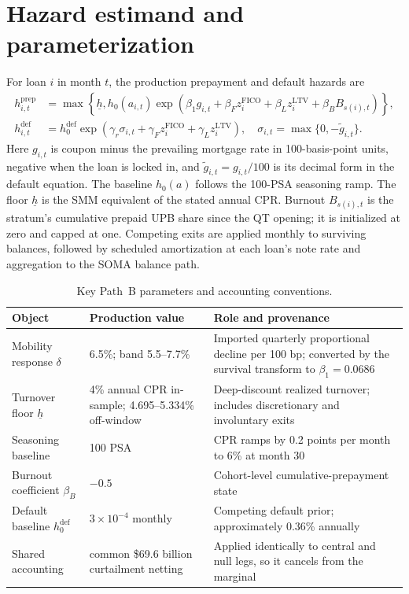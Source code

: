 \documentclass[12pt]{article}
\begin{document}
\section{Hazard estimand and parameterization}\label{app:params}

For loan $i$ in month $t$, the production prepayment and default hazards are
\begin{align}
h^{\mathrm{prep}}_{i,t}
 &= \max\!\left\{\underline h,
 h_0(a_{i,t})\exp\!\left(\beta_1 g_{i,t}+\beta_Fz_i^{\mathrm{FICO}}
 +\beta_Lz_i^{\mathrm{LTV}}+\beta_BB_{s(i),t}\right)\right\},
 \label{eq:appendix-prep}\\
h^{\mathrm{def}}_{i,t}
 &=h^{\mathrm{def}}_0\exp\!\left(\gamma_r\sigma_{i,t}
 +\gamma_Fz_i^{\mathrm{FICO}}+\gamma_Lz_i^{\mathrm{LTV}}\right),
 \quad \sigma_{i,t}=\max\{0,-\widetilde g_{i,t}\}.
 \label{eq:appendix-default}
\end{align}
Here $g_{i,t}$ is coupon minus the prevailing mortgage rate in 100-basis-point
units, negative when the loan is locked in, and $\widetilde g_{i,t}=g_{i,t}/100$
is its decimal form in the default equation. The baseline $h_0(a)$ follows the
100-PSA seasoning ramp. The floor $\underline h$ is the SMM equivalent of the
stated annual CPR. Burnout $B_{s(i),t}$ is the stratum's cumulative prepaid UPB
share since the QT opening; it is initialized at zero and capped at one.
Competing exits are applied monthly to surviving balances, followed by scheduled
amortization at each loan's note rate and aggregation to the SOMA balance path.

\begin{table}[tbp]
\centering
\small
\caption{Key Path~B parameters and accounting conventions.}
\label{tab:pathb-parameters-compact}
\begin{tabular}{@{}p{3.5cm}p{3.0cm}p{7.0cm}@{}}
\toprule
Object & Production value & Role and provenance \\
\midrule
Mobility response $\delta$ & 6.5\%; band 5.5--7.7\% & Imported quarterly proportional decline per 100 bp; converted by the survival transform to $\beta_1=0.0686$ \\
Turnover floor $\underline h$ & 4\% annual CPR in-sample; 4.695--5.334\% off-window & Deep-discount realized turnover; includes discretionary and involuntary exits \\
Seasoning baseline & 100 PSA & CPR ramps by 0.2 points per month to 6\% at month 30 \\
Burnout coefficient $\beta_B$ & $-0.5$ & Cohort-level cumulative-prepayment state \\
Default baseline $h^{\mathrm{def}}_0$ & $3\times10^{-4}$ monthly & Competing default prior; approximately 0.36\% annually \\
Shared accounting & common \$69.6 billion curtailment netting & Applied identically to central and null legs, so it cancels from the marginal \\
\bottomrule
\end{tabular}
\end{table}
\end{document}
